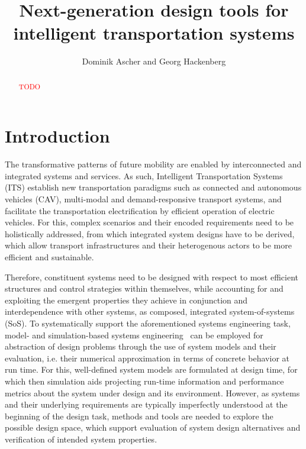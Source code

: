 \documentclass[10pt,twocolumn]{article}
\begin{document}
\title{Next-generation design tools for intelligent transportation systems}
\author{Dominik Ascher and Georg Hackenberg}
\maketitle

\begin{abstract}
    \textcolor{red}{TODO}
\end{abstract}

\section{Introduction}
\label{sec:introduction}

The transformative patterns of future mobility are enabled by interconnected and integrated systems and services.
As such, Intelligent Transportation Systems (ITS) establish new transportation paradigms such as connected and autonomous vehicles (CAV), multi-modal and demand-responsive transport systems, and facilitate the transportation electrification by efficient operation of electric vehicles. For this, complex scenarios and their encoded requirements need to be holistically addressed, from which integrated system designs have to be derived, which allow transport infrastructures and their heterogenous actors to be more efficient and sustainable.

Therefore, constituent systems need to be designed with respect to most efficient structures and control strategies within themselves, while accounting for and exploiting the emergent properties they achieve in conjunction and interdependence with other systems, as composed, integrated system-of-systems (SoS). To systematically support the aforementioned systems engineering task, model- and simulation-based systems engineering~\cite{gianni2014modeling} can be employed for abstraction of design problems through the use of system models and their evaluation, i.e. their numerical approximation in terms of concrete behavior at run time. For this, well-defined system models are formulated at design time, for which then simulation aids projecting run-time information and performance metrics about the system under design and its environment. 
However, as systems and their underlying requirements are typically imperfectly understood at the beginning of the design task, methods and tools are needed to explore the possible design space, which support evaluation of system design alternatives and verification of intended system properties. 
\end{document}
